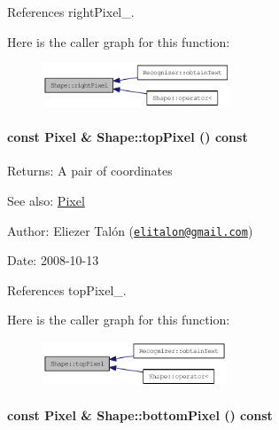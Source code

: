 References rightPixel\_\-.

Here is the caller graph for this function:\nopagebreak
\begin{figure}[H]
\begin{center}
\leavevmode
\includegraphics[width=159pt]{class_shape_c265e43fa90ee2ab7c9cd3a3d1e96d82_icgraph}
\end{center}
\end{figure}
\hypertarget{class_shape_063c4934d8c1cd4b02e4e3e4a604f62e}{
\paragraph[topPixel]{\setlength{\rightskip}{0pt plus 5cm}const {\bf Pixel} \& Shape::topPixel () const}\hfill}
\label{class_shape_063c4934d8c1cd4b02e4e3e4a604f62e}


\begin{Desc}
\item[Returns:]A pair of coordinates\end{Desc}
\begin{Desc}
\item[See also:]\hyperlink{_shape_8hpp_535e59456e3e633842529cfa8ea103c4}{Pixel}\end{Desc}
\begin{Desc}
\item[Author:]Eliezer Talón (\href{mailto:elitalon@gmail.com}{\tt elitalon@gmail.com}) \end{Desc}
\begin{Desc}
\item[Date:]2008-10-13 \end{Desc}


References topPixel\_\-.

Here is the caller graph for this function:\nopagebreak
\begin{figure}[H]
\begin{center}
\leavevmode
\includegraphics[width=156pt]{class_shape_063c4934d8c1cd4b02e4e3e4a604f62e_icgraph}
\end{center}
\end{figure}
\hypertarget{class_shape_99293804122214fa366d7f7ae794d077}{
\paragraph[bottomPixel]{\setlength{\rightskip}{0pt plus 5cm}const {\bf Pixel} \& Shape::bottomPixel () const}\hfill}
\label{class_shape_99293804122214fa366d7f7ae794d077}


